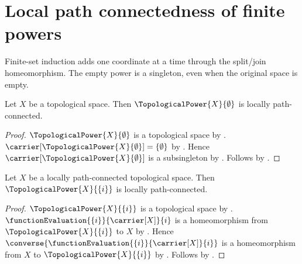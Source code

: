 \section{Local path connectedness of finite powers}





Finite-set induction adds one coordinate at a time through the split/join
homeomorphism. The empty power is a singleton, even when the original space
is empty.

\begin{theorem}\label{empty_topological_power_is_locally_path_connected}
    Let $X$ be a topological space.
    Then $\TopologicalPower{X}{\emptyset}$ is locally path-connected.
\end{theorem}
\begin{proof}
    $\TopologicalPower{X}{\emptyset}$ is a topological space by
        .
    $\carrier[\TopologicalPower{X}{\emptyset}]=\{\emptyset\}$ by
        .
    Hence $\carrier[\TopologicalPower{X}{\emptyset}]$ is a subsingleton by .
    Follows by .
\end{proof}

\begin{theorem}\label{singleton_topological_power_is_locally_path_connected}
    Let $X$ be a locally path-connected topological space.
    Then $\TopologicalPower{X}{\{i\}}$ is locally path-connected.
\end{theorem}
\begin{proof}
    $\TopologicalPower{X}{\{i\}}$ is a topological space by
        .
    $\functionEvaluation{\{i\}}{\carrier[X]}{i}$ is a homeomorphism from
        $\TopologicalPower{X}{\{i\}}$ to $X$ by .
    Hence $\converse{\functionEvaluation{\{i\}}{\carrier[X]}{i}}$ is a homeomorphism
        from $X$ to $\TopologicalPower{X}{\{i\}}$ by .
    Follows by .
\end{proof}

